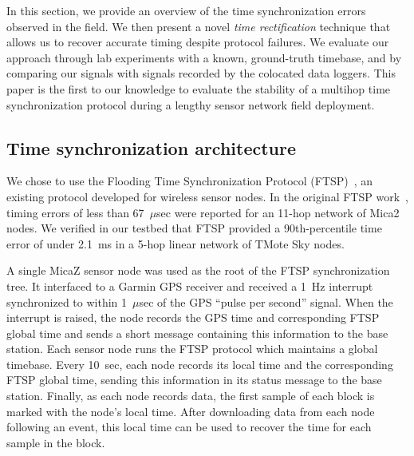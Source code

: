 In this section, we provide an overview of the time synchronization errors
observed in the field. We then present a novel {\em time rectification}
technique that allows us to recover accurate timing despite protocol
failures.  
We evaluate our approach through lab experiments with a known, ground-truth
timebase, and by comparing our signals with signals recorded by the colocated
data loggers. This paper is the first to our knowledge to evaluate the
stability of a multihop time synchronization protocol during a lengthy sensor
network field deployment. 

\subsection{Time synchronization architecture}

We chose to use the Flooding Time Synchronization Protocol
(FTSP)~\cite{ftsp}, an existing protocol developed for wireless sensor nodes.
In the original FTSP work~\cite{ftsp}, timing errors of less than 67~$\mu$sec
were reported for an 11-hop network of Mica2 nodes.  We verified in our
testbed that FTSP provided a 90th-percentile time error of under 2.1~ms in a
5-hop linear network of TMote Sky nodes.

A single MicaZ sensor node was used as the root of the FTSP synchronization
tree. It interfaced to a Garmin GPS receiver and received a 1~Hz interrupt
synchronized to within 1~$\mu$sec of the GPS ``pulse per second'' signal.
When the interrupt is raised, the node records the GPS time and corresponding
FTSP global time and sends a short message containing this information to the
base station.  Each sensor node runs the FTSP protocol which maintains a
global timebase. Every 10~sec, each node records its local time and the
corresponding FTSP global time, sending this information in its status
message to the base station. Finally, as each node records data, the first
sample of each block is marked with the node's local time. After downloading
data from each node following an event, this local time can be used to
recover the time for each sample in the block.

